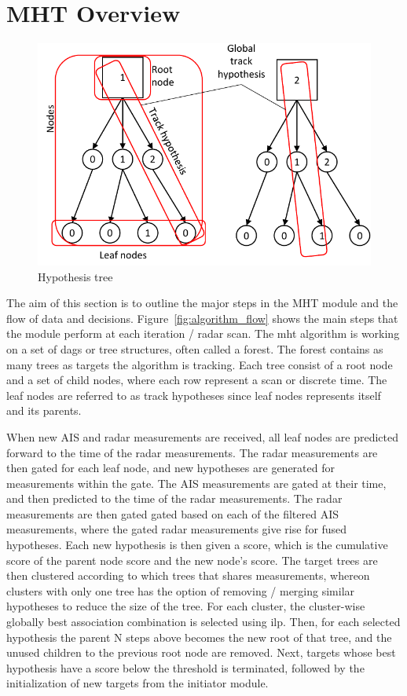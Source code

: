 \section{MHT Overview}
\begin{figure}
 \centering
 \includegraphics{Figures/Track-tree.pdf}
 \caption{Hypothesis tree}\label{fig:hyp_tree}
\end{figure}
The aim of this section is to outline the major steps in the MHT module and the flow of data and decisions. Figure~\ref{fig:algorithm_flow} shows the main steps that the module perform at each iteration / radar scan. The \gls{mht} algorithm is working on a set of \glspl{dag} or tree structures, often called a forest. The forest contains as many trees as targets the algorithm is tracking. Each tree consist of a root node and a set of child nodes, where each row represent a scan or discrete time. The leaf nodes are referred to as track hypotheses since leaf nodes represents itself and its parents.

 When new 	AIS and radar measurements are received, all leaf nodes are predicted forward to the time of the radar measurements. The radar measurements are then gated for each leaf node, and new hypotheses are generated for measurements within the gate. The AIS measurements are gated at their time, and then predicted to the time of the radar measurements. The radar measurements are then gated gated based on each of the filtered AIS measurements, where the gated radar measurements give rise for fused hypotheses. Each new hypothesis is then given a score, which is the cumulative score of the parent node score and the new node's score. The target trees are then clustered according to which trees that shares measurements, whereon clusters with only one tree has the option of removing / merging similar hypotheses to reduce the size of the tree. For each cluster, the cluster-wise globally best association combination is selected using \gls{ilp}. Then, for each selected hypothesis the parent N steps above becomes the new root of that tree, and the unused children to the previous root node are removed. Next, targets whose best hypothesis have a score below the threshold is terminated, followed by the initialization of new targets from the initiator module. 

